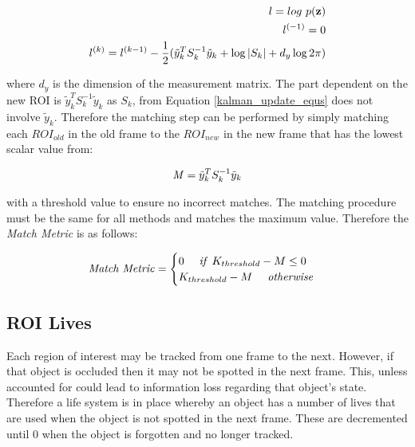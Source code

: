 \documentclass[a4paper,11pt,notitlepage]{article}
\begin{document}
\begin{equation}
\begin{aligned}
l = log \textnormal{ } p(\mathbf{z}) \\
l^{(-1)} = 0 \\
l^{(k)} = l^{(k-1)} - \frac{1}{2} (\tilde{y}_{k}^{T}S_{k}^{-1}\tilde{y}_{k} + \log |S_{k}| + d_{y}\log 2 \pi) 
\end{aligned}
\end{equation}

where $d_{y}$ is the dimension of the measurement matrix. The part dependent on the new ROI is $\tilde{y}_{k}^{T}S_{k}^{-1}\tilde{y}_{k}$ as $S_{k}$, from Equation \ref{kalman_update_equs} does not involve $\tilde{y}_{k}$. Therefore the matching step can be performed by simply matching each $ROI_{old}$ in the old frame to the $ROI_{new}$ in the new frame that has the lowest scalar value from:

\begin{equation}
\begin{aligned}
\textnormal{\textit{M}} = \tilde{y}_{k}^{T}S_{k}^{-1}\tilde{y}_{k}
\end{aligned}
\end{equation}

with a threshold value to ensure no incorrect matches. The matching procedure must be the same for all methods and matches the maximum value. Therefore the \textit{Match Metric} is as follows:

\begin{equation}
\begin{aligned}
\textnormal{\textit{Match Metric}} = 
\begin{cases}
0 \quad \textnormal{\textit{ if }} K_{threshold}-M \leq 0 \\
K_{threshold}-M \quad \textnormal{\textit{ otherwise}}
\end{cases}
\end{aligned}
\end{equation}


\subsection{ROI Lives}
Each region of interest may be tracked from one frame to the next. However, if that object is occluded then it may not be spotted in the next frame. This, unless accounted for could lead to information loss regarding that object's state. Therefore a life system is in place whereby an object has a number of lives that are used when the object is not spotted in the next frame. These are decremented until 0 when the object is forgotten and no longer tracked.  
\end{document}
